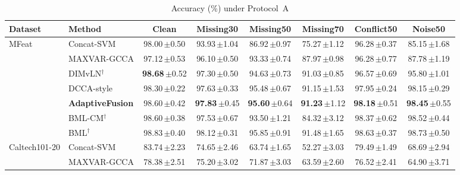 \begin{table}[!t]
\caption{Accuracy (\%) under Protocol~A}
\label{tab:mainA}
\centering
\footnotesize
\setlength{\tabcolsep}{3pt}
\begin{tabular}{llcccccc}
\toprule
Dataset & Method & Clean & Missing30 & Missing50 & Missing70 & Conflict50 & Noise50 \\
\midrule
\multirow{7}{*}{MFeat} & Concat-SVM & 98.00\,{\scriptsize$\pm$0.50} & 93.93\,{\scriptsize$\pm$1.04} & 86.92\,{\scriptsize$\pm$0.97} & 75.27\,{\scriptsize$\pm$1.12} & 96.28\,{\scriptsize$\pm$0.37} & 85.15\,{\scriptsize$\pm$1.68} \\
 & MAXVAR-GCCA & 97.12\,{\scriptsize$\pm$0.53} & 96.10\,{\scriptsize$\pm$0.50} & 93.33\,{\scriptsize$\pm$0.74} & 87.97\,{\scriptsize$\pm$0.98} & 96.28\,{\scriptsize$\pm$0.77} & 87.78\,{\scriptsize$\pm$1.19} \\
 & DIMvLN$^\dagger$ & \textbf{98.68}\,{\scriptsize$\pm$0.52} & 97.30\,{\scriptsize$\pm$0.50} & 94.63\,{\scriptsize$\pm$0.73} & 91.03\,{\scriptsize$\pm$0.85} & 96.57\,{\scriptsize$\pm$0.69} & 95.80\,{\scriptsize$\pm$1.01} \\
 & DCCA-style & 98.30\,{\scriptsize$\pm$0.22} & 97.63\,{\scriptsize$\pm$0.33} & 95.48\,{\scriptsize$\pm$0.67} & 91.15\,{\scriptsize$\pm$1.53} & 97.95\,{\scriptsize$\pm$0.24} & 98.15\,{\scriptsize$\pm$0.29} \\
 & \textbf{AdaptiveFusion} & 98.60\,{\scriptsize$\pm$0.42} & \textbf{97.83}\,{\scriptsize$\pm$0.45} & \textbf{95.60}\,{\scriptsize$\pm$0.64} & \textbf{91.23}\,{\scriptsize$\pm$1.12} & \textbf{98.18}\,{\scriptsize$\pm$0.51} & \textbf{98.45}\,{\scriptsize$\pm$0.55} \\
\cmidrule(lr){2-8}
 & BML-CM$^\dagger$ & 98.60\,{\scriptsize$\pm$0.38} & 97.53\,{\scriptsize$\pm$0.67} & 93.50\,{\scriptsize$\pm$1.21} & 84.32\,{\scriptsize$\pm$3.12} & 98.37\,{\scriptsize$\pm$0.62} & 98.52\,{\scriptsize$\pm$0.44} \\
 & BML$^\dagger$ & 98.83\,{\scriptsize$\pm$0.40} & 98.12\,{\scriptsize$\pm$0.31} & 95.85\,{\scriptsize$\pm$0.91} & 91.48\,{\scriptsize$\pm$1.65} & 98.63\,{\scriptsize$\pm$0.37} & 98.73\,{\scriptsize$\pm$0.50} \\
\midrule
\multirow{7}{*}{Caltech101-20} & Concat-SVM & 83.74\,{\scriptsize$\pm$2.23} & 74.65\,{\scriptsize$\pm$2.46} & 63.74\,{\scriptsize$\pm$1.65} & 52.27\,{\scriptsize$\pm$3.03} & 79.49\,{\scriptsize$\pm$1.49} & 68.69\,{\scriptsize$\pm$2.94} \\
 & MAXVAR-GCCA & 78.38\,{\scriptsize$\pm$2.51} & 75.20\,{\scriptsize$\pm$3.02} & 71.87\,{\scriptsize$\pm$3.03} & 63.59\,{\scriptsize$\pm$2.60} & 76.52\,{\scriptsize$\pm$2.41} & 64.90\,{\scriptsize$\pm$3.71} \\

\end{tabular}
\end{table}
